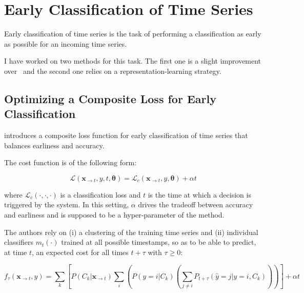 \section{Early Classification of Time Series}
\label{sec:early}

Early classification of time series is the task of performing a classification
as early as possible for an incoming time series.

I have worked on two methods for this task.
The first one is a slight improvement
over~\cite{dachraoui2015early} and the second one relies on a
representation-learning strategy.

\subsection{Optimizing a Composite Loss for Early Classification}

\cite{dachraoui2015early} introduces a composite loss function for early
classification of time series that balances earliness and accuracy.

The cost function is of the following form:

\begin{equation}
\mathcal{L}(\mathbf{x}_{\rightarrow t}, y, t, \boldsymbol{\theta}) =
    \mathcal{L}_c(\mathbf{x}_{\rightarrow t}, y, \boldsymbol{\theta}) + \alpha t
\label{eq:loss_early}
\end{equation}

\noindent
where $\mathcal{L}_c(\cdot,\cdot,\cdot)$ is a
classification loss and $t$ is the time at which a
decision is triggered by the system.
In this setting, $\alpha$ drives the tradeoff between accuracy and earliness
and is supposed to be a hyper-parameter of the method.

The authors rely on (i) a clustering of the
training
time series and (ii) individual classifiers $m_t(\cdot)$ trained at all possible
timestamps, so as to be able to predict, at time $t$, an expected cost for all
times $t + \tau$ with $\tau \geq 0$:

\begin{equation}
    f_\tau(\mathbf{x}_{\rightarrow t}, y) =
        \sum_k \left[ P(C_k | \mathbf{x}_{\rightarrow t})
        \sum_i \left( P(y=i | C_k)
        \left( \sum_{j \neq i} P_{t+\tau}(\hat{y} = j | y=i, C_k)
        \right) \right)
        \right]
        + \alpha t
        \label{eq:dachraoui}
\end{equation}

